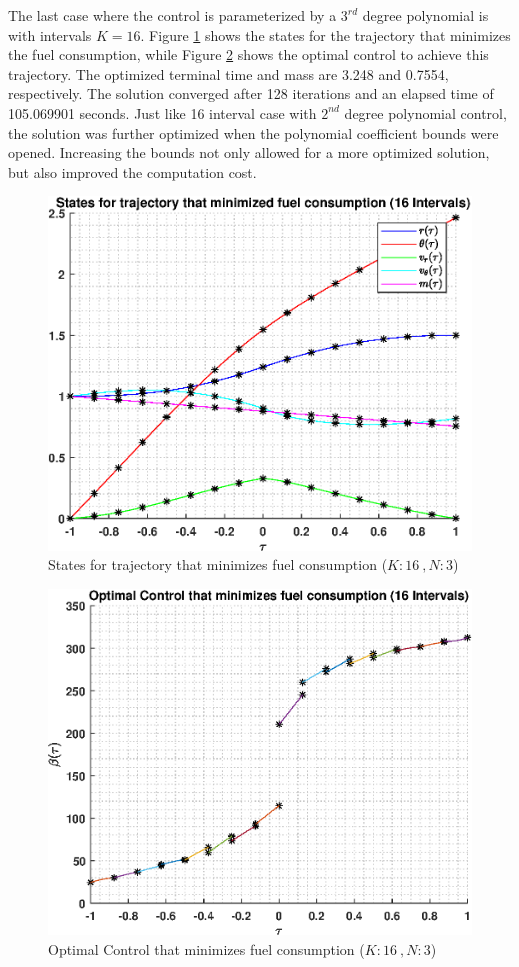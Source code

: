 \documentclass[]{article}
\begin{document}
The last case where the control is parameterized by a \(3^{rd}\) degree polynomial is with intervals \(K = 16\). Figure \ref{fig:directStatesK16Poly3} shows the states for the trajectory that minimizes the fuel consumption, while Figure \ref{fig:directControlK16Poly3} shows the optimal control to achieve this trajectory. The optimized terminal time and mass are 3.248 and 0.7554, respectively. The solution converged after 128 iterations and an elapsed time of 105.069901 seconds. Just like 16 interval case with \(2^{nd}\) degree polynomial control, the solution was further optimized when the polynomial coefficient bounds were opened. Increasing the bounds not only allowed for a more optimized solution, but also improved the computation cost.
\begin{figure}
	\centering
	\includegraphics[scale=0.75]{directStatesK16Poly3.eps}
	\caption{States for trajectory that minimizes fuel consumption (\(K:16\ , N:3\))}
	\label{fig:directStatesK16Poly3}
\end{figure}
\begin{figure}
	\centering
	\includegraphics[scale=0.75]{directControlK16Poly3.eps}
	\caption{Optimal Control that minimizes fuel consumption (\(K:16\ , N:3\))}
	\label{fig:directControlK16Poly3}
\end{figure}
\end{document}
